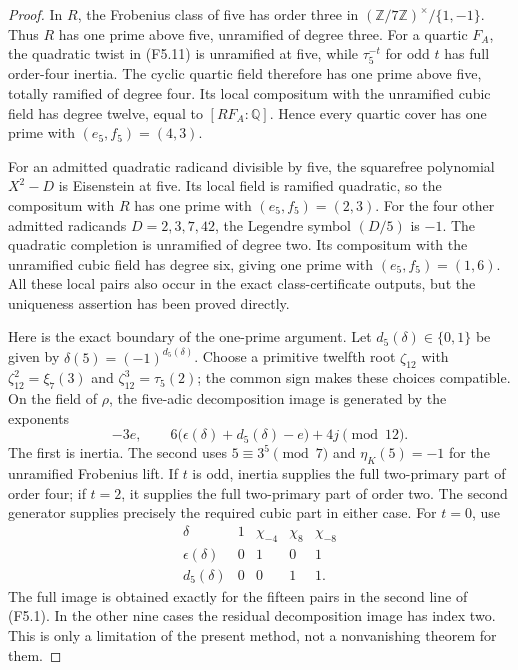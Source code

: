 \begin{proof}
In $R$, the Frobenius class of five has order three in
$(\mathbb Z/7\mathbb Z)^\times/\{1,-1\}$.
Thus $R$ has one prime above five, unramified of degree three.
For a quartic $F_A$, the quadratic twist in (F5.11) is
unramified at five, while $\tau_5^{-t}$ for odd $t$ has full
order-four inertia. The cyclic quartic field therefore has
one prime above five, totally ramified of degree four.
Its local compositum with the unramified cubic field has degree
twelve, equal to $[RF_A:\mathbb Q]$.
Hence every quartic cover has one prime with $(e_5,f_5)=(4,3)$.

For an admitted quadratic radicand divisible by five, the
squarefree polynomial $X^2-D$ is Eisenstein at five. Its
local field is ramified quadratic, so the compositum with
$R$ has one prime with $(e_5,f_5)=(2,3)$.
For the four other admitted radicands $D=2,3,7,42$, the
Legendre symbol $(D/5)$ is $-1$.
The quadratic completion is unramified of degree two.
Its compositum with the unramified cubic field has degree six,
giving one prime with $(e_5,f_5)=(1,6)$.
All these local pairs also occur in the exact class-certificate
outputs, but the uniqueness assertion has been proved directly.

Here is the exact boundary of the one-prime argument.
Let $d_5(\delta)\in\{0,1\}$ be given by
$\delta(5)=(-1)^{d_5(\delta)}$.
Choose a primitive twelfth root $\zeta_{12}$ with
$\zeta_{12}^2=\xi_7(3)$ and $\zeta_{12}^3=\tau_5(2)$;
the common sign makes these choices compatible.
On the field of $\rho$, the five-adic decomposition image
is generated by the exponents
\[
 -3e,\qquad 6\bigl(\epsilon(\delta)+d_5(\delta)-e\bigr)+4j
                              \pmod {12}.
 \tag{F5.21}
\]
The first is inertia. The second uses
$5\equiv3^5\pmod7$ and $\eta_K(5)=-1$ for the unramified
Frobenius lift. If $t$ is odd, inertia supplies the full
two-primary part of order four; if $t=2$, it supplies the
full two-primary part of order two. The second generator
supplies precisely the required cubic part in either case.
For $t=0$, use
\[
 \begin{array}{c|rrrr}
 \delta&1&\chi_{-4}&\chi_8&\chi_{-8}\\\hline
 \epsilon(\delta)&0&1&0&1\\
 d_5(\delta)&0&0&1&1.
 \end{array}\tag{F5.22}
\]
The full image is obtained exactly for the fifteen pairs in
the second line of (F5.1). In the other nine cases the residual
decomposition image has index two. This is only a limitation
of the present method, not a nonvanishing theorem for them.


\end{proof}
